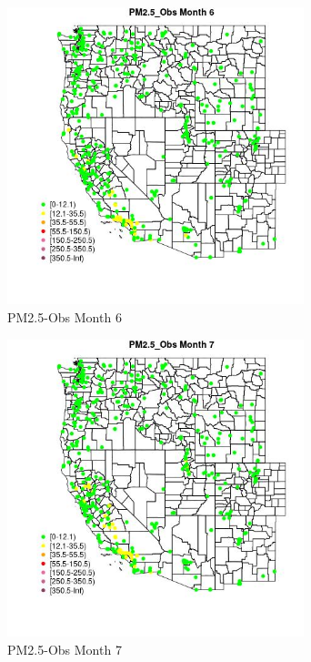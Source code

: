 \begin{figure} 
\centering  
\includegraphics[width=0.77\textwidth]{Code_Outputs/ML_input_report_ML_input_PM25_Step5_part_d_de_duplicated_aves_ML_input_MapObsMo6PM25_Obs.jpg} 
\caption{\label{fig:ML_input_report_ML_input_PM25_Step5_part_d_de_duplicated_aves_ML_inputMapObsMo6PM25_Obs}PM2.5-Obs Month 6} 
\end{figure} 
 

\begin{figure} 
\centering  
\includegraphics[width=0.77\textwidth]{Code_Outputs/ML_input_report_ML_input_PM25_Step5_part_d_de_duplicated_aves_ML_input_MapObsMo7PM25_Obs.jpg} 
\caption{\label{fig:ML_input_report_ML_input_PM25_Step5_part_d_de_duplicated_aves_ML_inputMapObsMo7PM25_Obs}PM2.5-Obs Month 7} 
\end{figure} 
 

